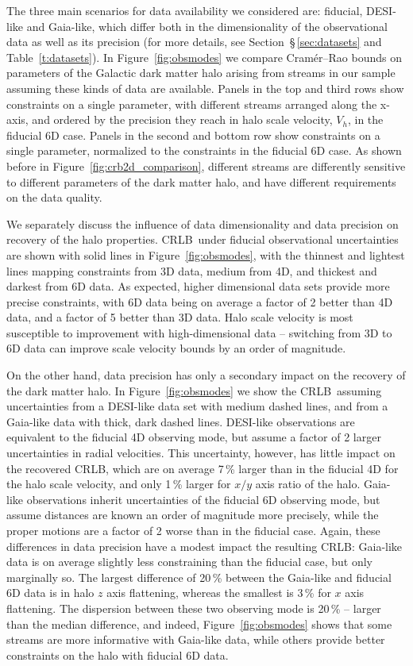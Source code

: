 \documentclass[modern]{aastex62}
\newcommand{\acronym}[1]{{\small{#1}}}
\newcommand{\CRLB}{\acronym{CRLB}}
\begin{document}
The three main scenarios for data availability we considered are: fiducial, DESI-like and Gaia-like, which differ both in the dimensionality of the observational data as well as its precision (for more details, see Section~\S\,\ref{sec:datasets} and Table~\ref{t:datasets}).
In Figure~\ref{fig:obsmodes} we compare Cram\'er--Rao bounds on parameters of the Galactic dark matter halo arising from streams in our sample assuming these kinds of data are available.
Panels in the top and third rows show constraints on a single parameter, with different streams arranged along the x-axis, and ordered by the precision they reach in halo scale velocity, $V_h$, in the fiducial 6D case.
Panels in the second and bottom row show constraints on a single parameter, normalized to the constraints in the fiducial 6D case.
As shown before in Figure~\ref{fig:crb2d_comparison}, different streams are differently sensitive to different parameters of the dark matter halo, and have different requirements on the data quality.

We separately discuss the influence of data dimensionality and data precision on recovery of the halo properties.
\CRLB\ under fiducial observational uncertainties are shown with solid lines in Figure~\ref{fig:obsmodes}, with the thinnest and lightest lines mapping constraints from 3D data, medium from 4D, and thickest and darkest from 6D data.
As expected, higher dimensional data sets provide more precise constraints, with 6D data being on average a factor of 2 better than 4D data, and a factor of 5 better than 3D data.
Halo scale velocity is most susceptible to improvement with high-dimensional data -- switching from 3D to 6D data can improve scale velocity bounds by an order of magnitude.

On the other hand, data precision has only a secondary impact on the recovery of the dark matter halo.
In Figure~\ref{fig:obsmodes} we show the \CRLB\ assuming uncertainties from a DESI-like data set with medium dashed lines, and from a Gaia-like data with thick, dark dashed lines.
DESI-like observations are equivalent to the fiducial 4D observing mode, but assume a factor of 2 larger uncertainties in radial velocities.
This uncertainty, however, has little impact on the recovered \CRLB, which are on average 7\,\% larger than in the fiducial 4D for the halo scale velocity, and only 1\,\% larger for $x/y$ axis ratio of the halo.
Gaia-like observations inherit uncertainties of the fiducial 6D observing mode, but assume distances are known an order of magnitude more precisely, while the proper motions are a factor of 2 worse than in the fiducial case.
Again, these differences in data precision have a modest impact the resulting \CRLB: Gaia-like data is on average slightly less constraining than the fiducial case, but only marginally so.
The largest difference of 20\,\% between the Gaia-like and fiducial 6D data is in halo $z$ axis flattening, whereas the smallest is 3\,\% for $x$ axis flattening.
The dispersion between these two observing mode is 20\,\% -- larger than the median difference, and indeed, Figure~\ref{fig:obsmodes} shows that some streams are more informative with Gaia-like data, while others provide better constraints on the halo with fiducial 6D data.
\end{document}
